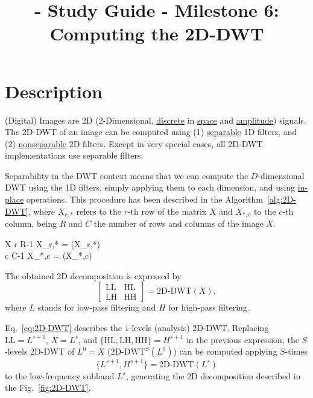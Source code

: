 
\title{\SM{} - Study Guide - Milestone 6: Computing the 2D-DWT}

\maketitle

\section{Description}

(Digital) Images are 2D
(2-Dimensional, \href{https://en.wikipedia.org/wiki/Discrete_time_and_continuous_time}{discrete}
in \href{https://en.wikipedia.org/wiki/Space}{space}
and \href{https://en.wikipedia.org/wiki/Amplitude}{amplitude})
signals. The 2D-DWT of an image can be computed using
(1) \href{https://en.wikipedia.org/wiki/Separable_filter}{separable}
1D filters, and
(2) \href{https://en.wikipedia.org/wiki/Non-separable_wavelet}{nonseparable}
2D filters. Except in very special cases, all 2D-DWT implementations
use separable filters.

Separability in the DWT context means that we can compute the
$D$-dimensional DWT using the 1D filters, simply applying them to each
dimension, and
using \href{https://en.wikipedia.org/wiki/In-place_algorithm}{in-place}
operations. This procedure has been described in the
Algorithm~\ref{alg:2D-DWT}, where $X_{r,*}$ refers to the $r$-th row
of the matrix $X$ and $X_{*,c}$ to the $c$-th column, being $R$ and
$C$ the number of rows and columns of the image $X$.

\begin{pseudocode}{}{X}
  \label{alg:2D-DWT}
  \FOR r  \TO R-1 \DO
  X_{r,*} = (X_{r,*})
  \\
  \FOR c  \TO C-1 \DO
  X_{*,c} = (X_{*,c})
\end{pseudocode}

The obtained 2D decomposition is expressed by
\begin{equation}
  \begin{bmatrix}
    \text{LL} & \text{HL} \\
    \text{LH} & \text{HH}
  \end{bmatrix}
  =
  \text{2D-DWT}(X),
  \label{eq:2D-DWT}
\end{equation}
where $L$ stands for low-pass filtering and $H$ for high-pass
filtering.

Eq.~\ref{eq:2D-DWT} describes the $1$-levels (analysis)
2D-DWT. Replacing $\text{LL}=L^{s+1}$, $X=L^s$, and
$\{\text{HL}, \text{LH}, \text{HH}\}=H^{s+1}$ in the previous
expression, the $S$-levels 2D-DWT of $L^0=X$ ($\text{2D-DWT}^S(L^0)$)
can be computed applying $S$-times
\begin{equation}
  \{L^{s+1}, H^{s+1}\} = \text{2D-DWT}(L^s)
\end{equation}
to the low-frequency subband $L^s$, generating the 2D decomposition
described in the Fig.~\ref{fig:2D-DWT}.


